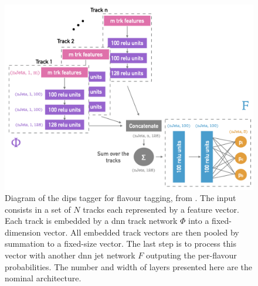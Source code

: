 \begin{figure}[h!]
  \center
  \includegraphics[scale=0.6]{Images/FTAG/dips_structure.png}
  \caption{Diagram of the \gls{dips} tagger for flavour tagging, from \cite{ATL-PHYS-PUB-2020-014}. The input consists in a set of $N$ tracks each represented by a feature vector. Each track is embedded by a \gls{dnn} track network $\Phi$ into a fixed-dimension vector. All embedded track vectors are then pooled by summation to a fixed-size vector. The last step is to process this vector with another \gls{dnn} jet network $F$ outputing the per-flavour probabilities. The number and width of layers presented here are the nominal architecture.} 
  \label{fig:dipsModel}
\end{figure}

